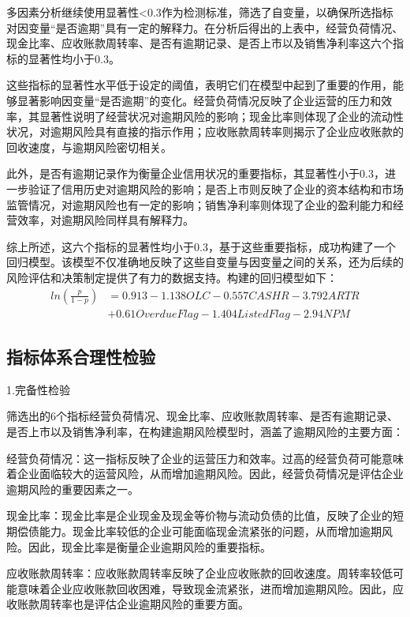 多因素分析继续使用显著性<0.3作为检测标准，筛选了自变量，以确保所选指标对因变量“是否逾期”具有一定的解释力。在分析后得出的上表中，经营负荷情况、现金比率、应收账款周转率、是否有逾期记录、是否上市以及销售净利率这六个指标的显著性均小于0.3。

这些指标的显著性水平低于设定的阈值，表明它们在模型中起到了重要的作用，能够显著影响因变量“是否逾期”的变化。经营负荷情况反映了企业运营的压力和效率，其显著性说明了经营状况对逾期风险的影响；现金比率则体现了企业的流动性状况，对逾期风险具有直接的指示作用；应收账款周转率则揭示了企业应收账款的回收速度，与逾期风险密切相关。

此外，是否有逾期记录作为衡量企业信用状况的重要指标，其显著性小于0.3，进一步验证了信用历史对逾期风险的影响；是否上市则反映了企业的资本结构和市场监管情况，对逾期风险也有一定的影响；销售净利率则体现了企业的盈利能力和经营效率，对逾期风险同样具有解释力。

综上所述，这六个指标的显著性均小于0.3，基于这些重要指标，成功构建了一个回归模型。该模型不仅准确地反映了这些自变量与因变量之间的关系，还为后续的风险评估和决策制定提供了有力的数据支持。构建的回归模型如下：
\begin{equation}
	\begin{split}
	ln(\frac{p}{1-p}) &= 0.913-1.138OLC-0.557CASHR-3.792ARTR \\
	&+0.61OverdueFlag-1.404ListedFlag-2.94NPM
\end{split}
\end{equation}



\subsection{指标体系合理性检验}
1.完备性检验

  筛选出的6个指标经营负荷情况、现金比率、应收账款周转率、是否有逾期记录、是否上市以及销售净利率，在构建逾期风险模型时，涵盖了逾期风险的主要方面：
  
  经营负荷情况：这一指标反映了企业的运营压力和效率。过高的经营负荷可能意味着企业面临较大的运营风险，从而增加逾期风险。因此，经营负荷情况是评估企业逾期风险的重要因素之一。
  
  现金比率：现金比率是企业现金及现金等价物与流动负债的比值，反映了企业的短期偿债能力。现金比率较低的企业可能面临现金流紧张的问题，从而增加逾期风险。因此，现金比率是衡量企业逾期风险的重要指标。
  
  应收账款周转率：应收账款周转率反映了企业应收账款的回收速度。周转率较低可能意味着企业应收账款回收困难，导致现金流紧张，进而增加逾期风险。因此，应收账款周转率也是评估企业逾期风险的重要方面。
  
